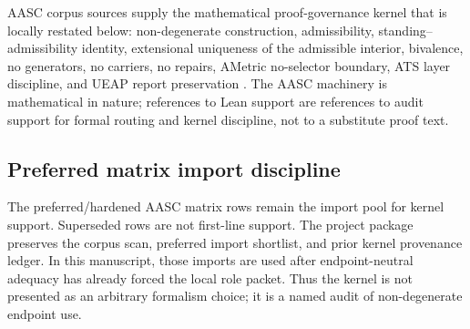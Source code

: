 \documentclass[11pt]{article}
\begin{document}
AASC corpus sources supply the mathematical proof-governance kernel that is locally restated below: non-degenerate construction, admissibility, standing--admissibility identity, extensional uniqueness of the admissible interior, bivalence, no generators, no carriers, no repairs, AMetric no-selector boundary, ATS layer discipline, and UEAP report preservation \cite{AASCMatrix2026,PreferredMatrixScan2026,AASC_Kernel_2026,AASC_Structure_Admissibility_2026,AASC_StandingIdentity_2026,AASC_ClaimStanding_UEAP_2026,AASC_AMetric_2026,AASC_ATS_2026,AASC_Bivalence_2026}. The AASC machinery is mathematical in nature; references to Lean support are references to audit support for formal routing and kernel discipline, not to a substitute proof text.

\subsection{Preferred matrix import discipline}
The preferred/hardened AASC matrix rows remain the import pool for kernel support. Superseded rows are not first-line support. The project package preserves the corpus scan, preferred import shortlist, and prior kernel provenance ledger. In this manuscript, those imports are used after endpoint-neutral adequacy has already forced the local role packet. Thus the kernel is not presented as an arbitrary formalism choice; it is a named audit of non-degenerate endpoint use.
\end{document}
